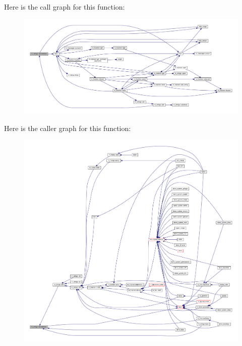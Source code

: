 Here is the call graph for this function\+:
\nopagebreak
\begin{figure}[H]
\begin{center}
\leavevmode
\includegraphics[width=350pt]{namespacem__strings_a90f3bdfa02c8ddff42cb15e66b124fe8_cgraph}
\end{center}
\end{figure}
Here is the caller graph for this function\+:
\nopagebreak
\begin{figure}[H]
\begin{center}
\leavevmode
\includegraphics[width=350pt]{namespacem__strings_a90f3bdfa02c8ddff42cb15e66b124fe8_icgraph}
\end{center}
\end{figure}
\mbox{\label{namespacem__strings_a9890da826d63d6f04367887007611cb5}} 
